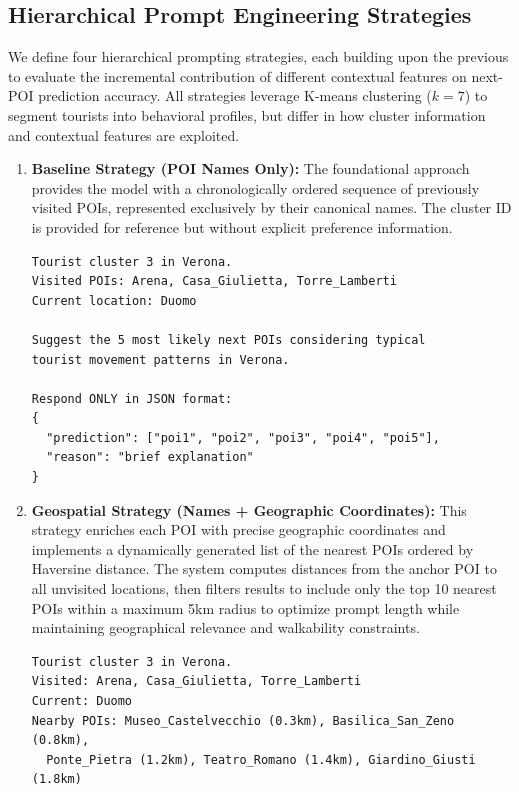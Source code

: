 \documentclass{article}
\begin{document}
\subsection{Hierarchical Prompt Engineering Strategies}

We define four hierarchical prompting strategies, each building upon the previous to evaluate the incremental contribution of different contextual features on next-POI prediction accuracy. All strategies leverage K-means clustering ($k=7$) to segment tourists into behavioral profiles, but differ in how cluster information and contextual features are exploited.

\begin{enumerate}

\item \textbf{Baseline Strategy (POI Names Only):}
The foundational approach provides the model with a chronologically ordered sequence of previously visited POIs, represented exclusively by their canonical names. The cluster ID is provided for reference but without explicit preference information.

\begin{lstlisting}[caption=Baseline Prompt Template]
Tourist cluster 3 in Verona.
Visited POIs: Arena, Casa_Giulietta, Torre_Lamberti
Current location: Duomo

Suggest the 5 most likely next POIs considering typical
tourist movement patterns in Verona.

Respond ONLY in JSON format:
{
  "prediction": ["poi1", "poi2", "poi3", "poi4", "poi5"],
  "reason": "brief explanation"
}
\end{lstlisting}

\item \textbf{Geospatial Strategy (Names + Geographic Coordinates):}
This strategy enriches each POI with precise geographic coordinates and implements a dynamically generated list of the nearest POIs ordered by Haversine distance. The system computes distances from the anchor POI to all unvisited locations, then filters results to include only the top 10 nearest POIs within a maximum 5km radius to optimize prompt length while maintaining geographical relevance and walkability constraints.

\begin{lstlisting}[caption=Geospatial-Enhanced Prompt Template]
Tourist cluster 3 in Verona.
Visited: Arena, Casa_Giulietta, Torre_Lamberti
Current: Duomo
Nearby POIs: Museo_Castelvecchio (0.3km), Basilica_San_Zeno (0.8km),
  Ponte_Pietra (1.2km), Teatro_Romano (1.4km), Giardino_Giusti (1.8km)


\end{lstlisting}
\end{enumerate}
\end{document}
